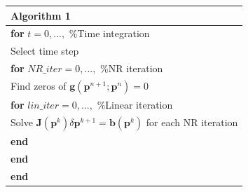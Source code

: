 \documentclass[review]{elsarticle}
\begin{document}
\begin{table}[!h]\centering
\begin{minipage}{1\textwidth}
\begin{tabular}{ |l| } 
\hline
\textbf{Algorithm 1}\\
\hline
\hline
\hspace{0.5cm}\textbf{for} $t=0,...,$    \hspace{52mm}    \%Time integration \\
\hspace{1cm} Select time step\\
\hspace{1cm}\textbf{for} $NR\_iter=0,...,$    \hspace{34mm}    \%NR iteration\\
 \hspace{1.5cm} Find zeros of $\mathbf{g}(\mathbf{p}^{n+1};\mathbf{p}^n)=0$\\
\hspace{1.5cm}\textbf{for} $lin\_iter=0,...,$    \hspace{31mm}    \%Linear iteration \\
\hspace{2cm}Solve $\mathbf{J}(\mathbf{p}^k)\delta \mathbf{p}^{k+1}=\mathbf{b}(\mathbf{p}^k)$ for each NR iteration\\
\hspace{1.5cm}\textbf{end}\\
\hspace{1cm}\textbf{end}\\
\hspace{0.5cm}\textbf{end}\\
\hline
\end{tabular}
\end{minipage}
\end{table}
\end{document}
